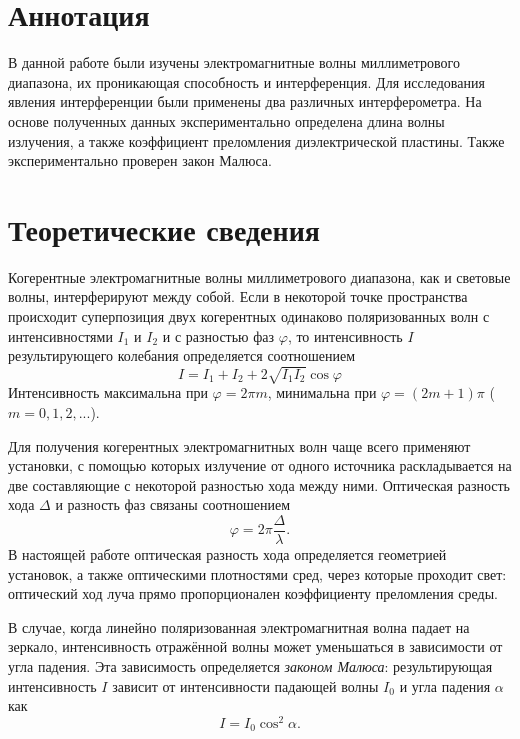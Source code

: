 \section{Аннотация}
В данной работе были изучены электромагнитные волны миллиметрового диапазона, их проникающая способность и интерференция. Для исследования явления интерференции были применены два различных интерферометра. На основе полученных данных экспериментально определена длина волны излучения, а также коэффициент преломления диэлектрической пластины. Также экспериментально проверен закон Малюса.

\section{Теоретические сведения}
Когерентные электромагнитные волны миллиметрового диапазона, как и световые волны, интерферируют между собой. Если в некоторой точке пространства происходит суперпозиция двух когерентных одинаково поляризованных волн с интенсивностями $I_1$ и $I_2$ и с разностью фаз $\varphi$, то интенсивность $I$ результирующего колебания определяется соотношением 
\begin{equation}\label{interf}
    I = I_1 + I_2 + 2\sqrt{I_1 I_2}\cos \varphi
\end{equation}
Интенсивность максимальна при $\varphi = 2\pi m$, минимальна при $\varphi = (2m+1)\pi$ ($m = 0, 1, 2, ...$). 

Для получения когерентных электромагнитных волн чаще всего применяют установки, с помощью которых излучение от одного источника раскладывается на две составляющие с некоторой разностью хода между ними. Оптическая разность хода $\Delta$ и разность фаз связаны соотношением
\begin{equation}\label{pathDiff}
   \varphi = 2\pi\frac{\Delta}{\lambda}. 
\end{equation}
В настоящей работе оптическая разность хода определяется геометрией установок, а также оптическими плотностями сред, через которые проходит свет: оптический ход луча прямо пропорционален коэффициенту преломления среды.

В случае, когда линейно поляризованная электромагнитная волна падает на зеркало, интенсивность отражённой волны может уменьшаться в зависимости от угла падения. Эта зависимость определяется \textit{законом Малюса}: результирующая интенсивность $I$ зависит от интенсивности падающей волны $I_0$ и угла падения $\alpha$ как
\begin{equation}\label{Malus}
    I = I_0\cos^2 \alpha.
\end{equation}
